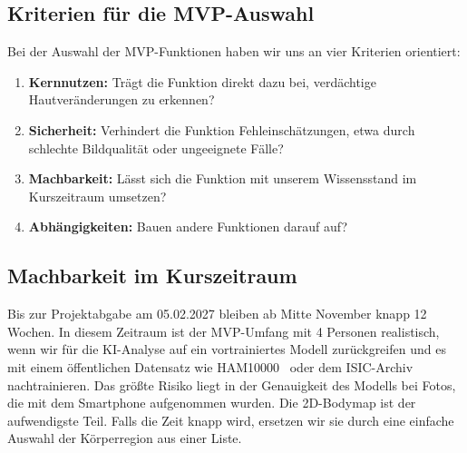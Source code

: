 \subsection{Kriterien für die MVP-Auswahl}

Bei der Auswahl der MVP-Funktionen haben wir uns an vier Kriterien orientiert:

\begin{enumerate}
\item \textbf{Kernnutzen:} Trägt die Funktion direkt dazu bei, verdächtige Hautveränderungen zu erkennen?
\item \textbf{Sicherheit:} Verhindert die Funktion Fehleinschätzungen, etwa durch schlechte Bildqualität oder ungeeignete Fälle?
\item \textbf{Machbarkeit:} Lässt sich die Funktion mit unserem Wissensstand im Kurszeitraum umsetzen?
\item \textbf{Abhängigkeiten:} Bauen andere Funktionen darauf auf?
\end{enumerate}

\subsection{Machbarkeit im Kurszeitraum}
\label{sec:machbarkeit}

Bis zur Projektabgabe am 05.02.2027 bleiben ab Mitte November knapp 12 Wochen. In diesem Zeitraum ist der MVP-Umfang mit 4 Personen realistisch, wenn wir für die KI-Analyse auf ein vortrainiertes Modell zurückgreifen und es mit einem öffentlichen Datensatz wie HAM10000~\cite{tschandl2018ham10000} oder dem ISIC-Archiv~\cite{isic-archive} nachtrainieren. Das größte Risiko liegt in der Genauigkeit des Modells bei Fotos, die mit dem Smartphone aufgenommen wurden. Die 2D-Bodymap ist der aufwendigste Teil. Falls die Zeit knapp wird, ersetzen wir sie durch eine einfache Auswahl der Körperregion aus einer Liste.
